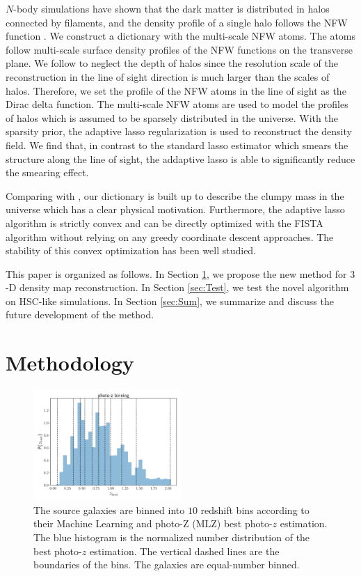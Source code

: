 \documentclass[twocolumn]{aastex62}
\begin{document}
$N$-body simulations have shown that the dark matter is distributed in halos connected by filaments, and the density
profile of a single halo follows the NFW function \citep{halo-NFW1997ApJ}.
We construct a dictionary with the multi-scale NFW atoms.  The atoms follow multi-scale surface density profiles of the 
NFW functions \citep{haloModel-TJ2003-3pt} on the transverse plane. We follow \citet{LSS-massMap-Glimpse3D-Leonard2014}
to neglect the depth of halos since the resolution scale of the reconstruction in the line of sight direction is much
larger than the scales of halos. Therefore, we set the profile of the NFW atoms in the line of sight as the Dirac delta
function. The multi-scale NFW atoms are used to model the profiles of halos which is assumed to be sparsely distributed
in the universe. With the sparsity prior, the adaptive lasso regularization \citep{AdaLASSO-Zou2006} is used to reconstruct
the density field. We find that, in contrast to the standard lasso estimator which smears the structure along the line of sight,
the addaptive lasso is able to significantly reduce the smearing effect.

Comparing with \citet{LSS-massMap-Glimpse3D-Leonard2014}, our dictionary is built up to describe the clumpy mass
in the universe which has a clear physical motivation. Furthermore, the adaptive lasso algorithm is strictly convex and
can be directly optimized with the FISTA algorithm \citep{FISTA-Beck2009} without relying on any greedy coordinate
descent approaches. The stability of this convex optimization has been well studied.

This paper is organized as follows.
In Section \ref{sec:Method}, we propose the new method for $3$-D density map reconstruction.
In Section \ref{sec:Test}, we test the novel algorithm on HSC-like simulations.
In Section \ref{sec:Sum}, we summarize and discuss the future development of the method.

\section{Methodology}
\label{sec:Method}

\begin{figure}[!t]
 \centering
 \includegraphics[width=0.5\textwidth]{photo-z_binning.pdf}
 \caption{The source galaxies are binned into $10$ redshift bins according to their Machine Learning and photo-Z (MLZ) 
        best photo-$z$ estimation. The blue histogram is the normalized number distribution of the best photo-$z$ estimation. 
        The vertical dashed lines are the boundaries of the bins. The galaxies are equal-number binned.} \label{fig-bestpz}
\end{figure}
\end{document}
